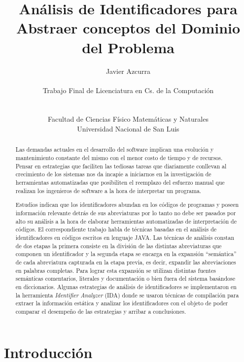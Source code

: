 \documentclass[12pt]{report}
\title{Análisis de Identificadores para Abstraer conceptos del Dominio del Problema}
\author{Javier Azcurra\\\\Trabajo Final de Licenciatura en Cs. de la Computación\\\\\\Facultad de Ciencias Físico Matemáticas y Naturales\\Universidad Nacional de San Luis}
\begin{document}
\maketitle



\begin{abstract}
Las demandas actuales en el desarrollo del software implican una evolución y mantenimiento constante del mismo con el menor costo de tiempo y de recursos. Pensar en estrategias que faciliten las tediosas tareas que diariamente conllevan al crecimiento de los sistemas nos da incapie a iniciarnos en la investigación de herramientas automatizadas que posibiliten el reemplazo del esfuerzo manual que realizan los ingenieros de software a la hora de interpretar un programa.

Estudios indican que los identificadores abundan en los códigos de programas y poseen información relevante detrás de sus abreviaturas por lo tanto no debe ser pasados por alto su análisis a la hora de elaborar herramientas automatizadas de interpretación de códigos.
El correspondiente trabajo habla de técnicas basadas en el análisis de identificadores en códigos escritos en lenguaje JAVA\texttrademark .
Las técnicas de análisis constan de dos etapas la primera consiste en la división de las distintas abreviaturas que componen un identificador y la segunda etapa se encarga en la expansión ``semántica'' de cada abreviatura capturada en la etapa previa, es decir, expandir las abreviaciones en palabras completas. Para lograr esta expansión se utilizan distintas fuentes semánticas comentarios, literales y documentación o bien fuera del sistema basándose en diccionarios. Algunas estrategias de análisis de identificadores se implementaron en la herramienta \textit{Identifier Analyzer} (IDA) donde se usaron técnicas de compilación para extraer la información estática y analizar los identificadores con el objeto de poder comparar el desempeño de las estrategias y arribar a conclusiones.




\end{abstract}

\chapter{Introducción}
\end{document}
